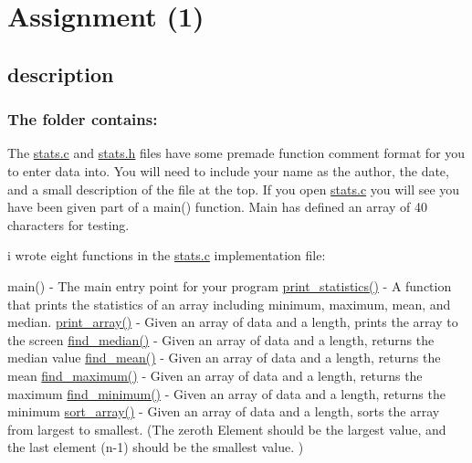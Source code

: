 \section*{Assignment (1)}

\subsection*{description}

\subsubsection*{The folder contains\+:}

The \hyperlink{stats_8c}{stats.\+c} and \hyperlink{stats_8h}{stats.\+h} files have some premade function comment format for you to enter data into. You will need to include your name as the author, the date, and a small description of the file at the top. If you open \hyperlink{stats_8c}{stats.\+c} you will see you have been given part of a main() function. Main has defined an array of 40 characters for testing.

i wrote eight functions in the \hyperlink{stats_8c}{stats.\+c} implementation file\+:

main() -\/ The main entry point for your program \hyperlink{stats_8c_a71e084b13a43fce6ba8c3da8844d5930}{print\+\_\+statistics()} -\/ A function that prints the statistics of an array including minimum, maximum, mean, and median. \hyperlink{stats_8c_a39b6ac0fc13776ce19713d37afbe9a4e}{print\+\_\+array()} -\/ Given an array of data and a length, prints the array to the screen \hyperlink{stats_8c_ae8b0d93a4554a415008dc13c55f6baf0}{find\+\_\+median()} -\/ Given an array of data and a length, returns the median value \hyperlink{stats_8c_af3a2d4146fca6e091ac514c1a6cd53b6}{find\+\_\+mean()} -\/ Given an array of data and a length, returns the mean \hyperlink{stats_8c_aafc6e044911efc1a3625ec30d7791929}{find\+\_\+maximum()} -\/ Given an array of data and a length, returns the maximum \hyperlink{stats_8c_aa1153a7c7cc16936b57ba61ee4a95cde}{find\+\_\+minimum()} -\/ Given an array of data and a length, returns the minimum \hyperlink{stats_8c_a0d38e2dcfb6751cb709d525c153efd99}{sort\+\_\+array()} -\/ Given an array of data and a length, sorts the array from largest to smallest. (The zeroth Element should be the largest value, and the last element (n-\/1) should be the smallest value. ) 